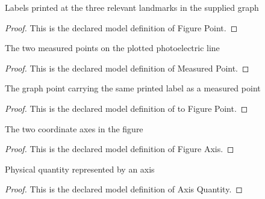 \begin{definition}
  \label{def:physics:phyx-mini-0549:phyxminiproblems-problemphyxmini0549-figurepoint}
  Labels printed at the three relevant landmarks in the supplied graph
\end{definition}
\begin{proof}
  This is the declared model definition of Figure Point.
\end{proof}
\begin{definition}
  \label{def:physics:phyx-mini-0549:phyxminiproblems-problemphyxmini0549-measuredpoint}
  The two measured points on the plotted photoelectric line
\end{definition}
\begin{proof}
  This is the declared model definition of Measured Point.
\end{proof}
\begin{definition}
  \label{def:physics:phyx-mini-0549:phyxminiproblems-problemphyxmini0549-measuredpoint-tofigurepoint}
  The graph point carrying the same printed label as a measured point
\end{definition}
\begin{proof}
  This is the declared model definition of to Figure Point.
\end{proof}
\begin{definition}
  \label{def:physics:phyx-mini-0549:phyxminiproblems-problemphyxmini0549-figureaxis}
  The two coordinate axes in the figure
\end{definition}
\begin{proof}
  This is the declared model definition of Figure Axis.
\end{proof}
\begin{definition}
  \label{def:physics:phyx-mini-0549:phyxminiproblems-problemphyxmini0549-axisquantity}
  Physical quantity represented by an axis
\end{definition}
\begin{proof}
  This is the declared model definition of Axis Quantity.
\end{proof}
